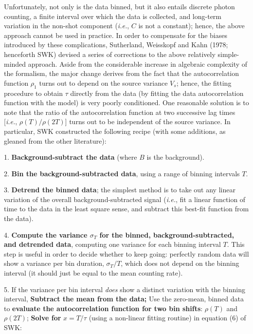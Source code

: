 Unfortunately, not only is the data binned, but it also entails
discrete photon counting, a finite interval over which the data is
collected, and long-term variation in the non-shot component ({\it i.e.}, $C$
is not a constant); hence, the above approach cannot be used in
practice.  In order to compensate for the biases introduced by these
complications, Sutherland, Weisskopf and Kahn (1978; henceforth SWK)
devised a series of corrections to the above relatively simple-minded
approach.  Aside from the considerable increase in algebraic
complexity of the formalism, the major change derives from the fact
that the autocorrelation function $\rho_{1}$ turns out to depend on
the source variance $V_{s}$; hence, the fitting procedure to obtain
$\tau$ directly from the data (by fitting the data autocorrelation
function with the model) is very poorly conditioned.  One reasonable
solution is to note that the ratio of the autocorrelation function at
two successive lag times [{\it i.e.}, $\rho(T)/\rho(2T)$] turns out to be
independent of the source variance.  In particular, SWK constructed
the following recipe (with some additions, as gleaned from the other
literature):

\vskip 12pt

\item{1.} {\bf Background-subtract the data} (where $B$ is the
background).
\item{2.} {\bf Bin the background-subtracted data}, using a range of
binning intervals $T$.
\item{3.} {\bf Detrend the binned data}; the simplest method is to
take out any linear variation of the overall background-subtracted
signal ({\it i.e.}, fit a linear function of time to the data in the least
square sense, and subtract this best-fit function from the data).
\item{4.} {\bf Compute the variance $\sigma_{T}$ for the binned,
background-subtracted, and detrended data}, computing one variance for
each binning interval $T$.  This step is useful in order to decide
whether to keep going:  perfectly random data will show a variance per
bin duration, $\sigma_{T}/T$, which does not depend on the binning
interval (it should just be equal to the mean counting rate).
\item{5.} If the variance per bin interval {\it does} show a distinct
variation with the binning interval,
 {\bf Subtract the mean from the data;}
 Use the zero-mean, binned data to {\bf evaluate the
autocorrelation function for two bin shifts}: $\rho(T)$ and $\rho(2T)$;
 {\bf Solve for} $x = T/\tau$ (using a non-linear
fitting routine) in equation (6) of SWK:

